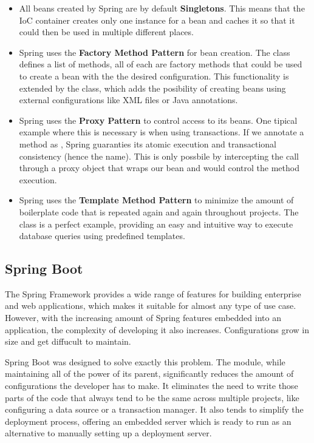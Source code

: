 \begin{itemize}
    \item All beans created by Spring are by default \textbf{Singletons}. This means that the IoC container creates only one instance for a bean and caches it so that it could then be used in multiple different places.
    \item Spring uses the \textbf{Factory Method Pattern} for bean creation. The  class defines a list of  methods, all of each are factory methods that could be used to create a bean with the the desired configuration. This functionality is extended by the  class, which adds the posibility of creating beans using external configurations like XML files or Java annotations.
    \item Spring uses the \textbf{Proxy Pattern} to control access to its beans. One tipical example where this is necessary is when using transactions. If we annotate a method as , Spring guaranties its atomic execution and transactional consistency (hence the name). This is only possbile by intercepting the call through a proxy object that wraps our bean and would control the method execution.
    \item Spring uses the \textbf{Template Method Pattern} to minimize the amount of boilerplate code that is repeated again and again throughout projects. The  class is a perfect example, providing an easy and intuitive way to execute database queries using predefined templates.
\end{itemize}


\subsection{Spring Boot}
\label{subsection:springBoot}

The Spring Framework provides a wide range of features for building enterprise and web applications, which makes it suitable for almost any type of use case. However, with the increasing amount of Spring features embedded into an application, the complexity of developing it also increases. Configurations grow in size and get diffucult to maintain.

Spring Boot was designed to solve exactly this problem. The module, while maintaining all of the power of its parent, significantly reduces the amount of configurations the developer has to make. It eliminates the need to write those parts of the code that always tend to be the same across multiple projects, like configuring a data source or a transaction manager. It also tends to simplify the deployment process, offering an embedded server which is ready to run as an alternative to manually setting up a deployment server.

